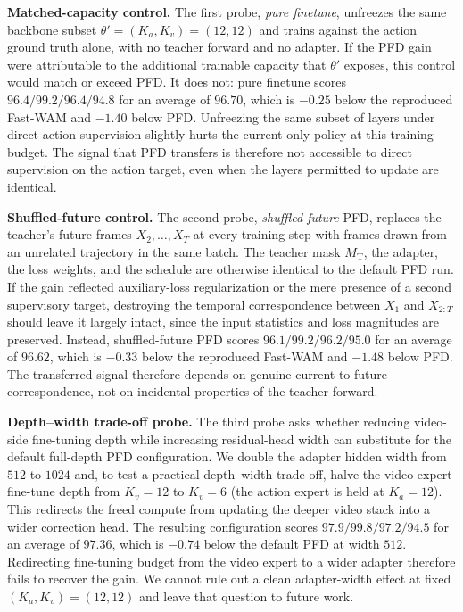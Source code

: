 \documentclass{article}
\begin{document}
\noindent\textbf{Matched-capacity control.} The first probe, \emph{pure finetune}, unfreezes the same backbone subset $\theta' = (K_a, K_v) = (12, 12)$ and trains against the action ground truth alone, with no teacher forward and no adapter. If the PFD gain were attributable to the additional trainable capacity that $\theta'$ exposes, this control would match or exceed PFD. It does not: pure finetune scores $96.4 / 99.2 / 96.4 / 94.8$ for an average of $96.70$, which is $-0.25$ below the reproduced Fast-WAM and $-1.40$ below PFD. Unfreezing the same subset of layers under direct action supervision slightly hurts the current-only policy at this training budget. The signal that PFD transfers is therefore not accessible to direct supervision on the action target, even when the layers permitted to update are identical.

\noindent\textbf{Shuffled-future control.} The second probe, \emph{shuffled-future} PFD, replaces the teacher's future frames $X_2, \ldots, X_T$ at every training step with frames drawn from an unrelated trajectory in the same batch. The teacher mask $M_\mathrm{T}$, the adapter, the loss weights, and the schedule are otherwise identical to the default PFD run. If the gain reflected auxiliary-loss regularization or the mere presence of a second supervisory target, destroying the temporal correspondence between $X_1$ and $X_{2:T}$ should leave it largely intact, since the input statistics and loss magnitudes are preserved. Instead, shuffled-future PFD scores $96.1 / 99.2 / 96.2 / 95.0$ for an average of $96.62$, which is $-0.33$ below the reproduced Fast-WAM and $-1.48$ below PFD. The transferred signal therefore depends on genuine current-to-future correspondence, not on incidental properties of the teacher forward.

\noindent\textbf{Depth--width trade-off probe.} The third probe asks whether reducing video-side fine-tuning depth while increasing residual-head width can substitute for the default full-depth PFD configuration. We double the adapter hidden width from $512$ to $1024$ and, to test a practical depth--width trade-off, halve the video-expert fine-tune depth from $K_v = 12$ to $K_v = 6$ (the action expert is held at $K_a = 12$). This redirects the freed compute from updating the deeper video stack into a wider correction head. The resulting configuration scores $97.9 / 99.8 / 97.2 / 94.5$ for an average of $97.36$, which is $-0.74$ below the default PFD at width $512$. Redirecting fine-tuning budget from the video expert to a wider adapter therefore fails to recover the gain. We cannot rule out a clean adapter-width effect at fixed $(K_a, K_v) = (12, 12)$ and leave that question to future work.
\end{document}
